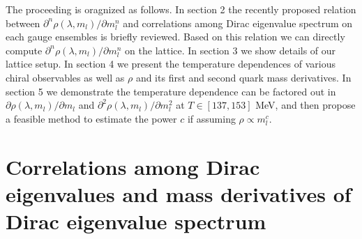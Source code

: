 \documentclass[a4paper,11pt]{article}
\numberwithin{equation}{section}
\begin{document}
The proceeding is oragnized as follows.
In section 2 the recently proposed relation between $\partial ^n\rho(\lambda, m_l) / \partial m_{l}^n$ and correlations among Dirac eigenvalue spectrum on each gauge ensembles is briefly reviewed. Based on this relation we can directly compute $\partial ^n\rho(\lambda, m_l) / \partial m_{l}^n$ on the lattice.
In section 3 we show details of our lattice setup.
In section 4 we present the temperature dependences of various chiral observables as well as $\rho$ and its first and second quark mass derivatives.
In section 5 we demonstrate the temperature dependence can be factored out in $\partial \rho(\lambda, m_l)/ \partial m_l$ and $\partial^2 \rho(\lambda, m_l)/ \partial m_l^2$ at $T \in [137,153]$ MeV, and then propose a feasible method to estimate the power $c$ if assuming $\rho \propto m_l^{c}$.








 
 








\section{Correlations among Dirac eigenvalues and mass derivatives of Dirac eigenvalue spectrum}
\end{document}
